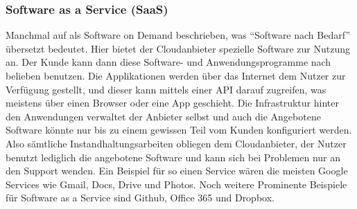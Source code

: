 \subsubsection{Software as a Service (SaaS)}
Manchmal auf als Software on Demand beschrieben, was "`Software nach Bedarf"' übersetzt bedeutet. Hier bietet der Cloudanbieter spezielle Software zur Nutzung an. Der Kunde kann dann diese Software- und Anwendungsprogramme nach belieben benutzen. Die Applikationen werden über das Internet dem Nutzer zur Verfügung gestellt, und dieser kann mittels einer API darauf zugreifen, was meistens über einen Browser oder eine App geschieht. Die Infrastruktur hinter den Anwendungen verwaltet der Anbieter selbst und auch die Angebotene Software könnte nur bis zu einem gewissen Teil vom Kunden konfiguriert werden. Also sämtliche Instandhaltungsarbeiten obliegen dem Cloudanbieter, der Nutzer benutzt lediglich die angebotene Software und kann sich bei Problemen nur an den Support wenden.\newline
\newline
Ein Beispiel für so einen Service wären die meisten Google Services wie Gmail, Docs, Drive und Photos. Noch weitere Prominente Beispiele für Software as a Service sind Github, Office 365 und Dropbox.


